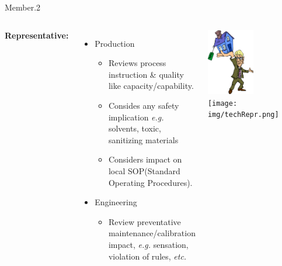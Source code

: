 \begin{frame}{Member.2}
\begin{columns}
\textbf{Representative:}
\begin{itemize}
	\item Production
	\begin{itemize}
		\item Reviews process instruction \& quality like capacity/capability.
		\item Consides any safety implication \textit{e.g.} solvents, toxic, sanitizing materials
		\item Considers impact on local SOP(Standard Operating Procedures).
	\end{itemize}
	\item Engineering
	\begin{itemize}
		\item Review preventative maintenance/calibration impact, \textit{e.g.} sensation, violation of rules, \textit{etc.}
	\end{itemize}
\end{itemize}
\includegraphics[width=0.5\textwidth]{img/prodRepr.png}\\
\texttt{[image: img/techRepr.png]}
\end{columns}
\end{frame}

